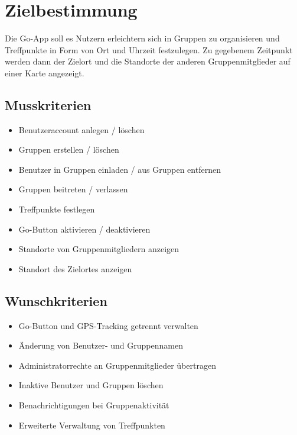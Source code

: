 \section{Zielbestimmung}
Die Go-App soll es Nutzern erleichtern sich in Gruppen zu organisieren
und Treffpunkte in Form von Ort und Uhrzeit festzulegen. Zu gegebenem Zeitpunkt werden dann der Zielort und die Standorte der anderen Gruppenmitglieder auf einer Karte angezeigt.


\subsection{Musskriterien}
\begin{itemize}
	\item Benutzeraccount anlegen / löschen
	\item Gruppen erstellen / löschen
	\item Benutzer in Gruppen einladen / aus Gruppen entfernen
	\item Gruppen beitreten / verlassen
	\item Treffpunkte festlegen
	\item Go-Button aktivieren / deaktivieren
	\item Standorte von Gruppenmitgliedern anzeigen
	\item Standort des Zielortes anzeigen
\end{itemize}

\subsection{Wunschkriterien}
\begin{itemize}
	\item Go-Button und GPS-Tracking getrennt verwalten
	\item Änderung von Benutzer- und Gruppennamen
	\item Administratorrechte an Gruppenmitglieder übertragen
	\item Inaktive Benutzer und Gruppen löschen	
	\item Benachrichtigungen bei Gruppenaktivität
	\item Erweiterte Verwaltung von Treffpunkten
\end{itemize}

